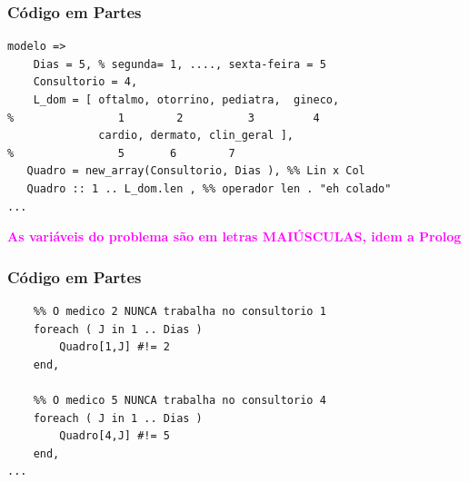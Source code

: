 \documentclass{beamer}
\begin{document}
\begin{frame}[fragile] 

\frametitle{Código em Partes}

\begin{footnotesize}
\begin{verbatim}
modelo => 
    Dias = 5, % segunda= 1, ...., sexta-feira = 5
    Consultorio = 4,
    L_dom = [ oftalmo, otorrino, pediatra,  gineco, 
%                1        2          3         4
              cardio, dermato, clin_geral ],
%                5       6        7
   Quadro = new_array(Consultorio, Dias ), %% Lin x Col
   Quadro :: 1 .. L_dom.len , %% operador len . "eh colado"
...
\end{verbatim}

\end{footnotesize}

{\bf \textcolor{magenta}{As variáveis do problema são em letras MAIÚSCULAS, idem a Prolog}}   
    
\end{frame}
\begin{frame}[fragile] 

\frametitle{Código em Partes}

\begin{footnotesize}
\begin{verbatim}
    %% O medico 2 NUNCA trabalha no consultorio 1
    foreach ( J in 1 .. Dias ) 
        Quadro[1,J] #!= 2
    end,
    
    %% O medico 5 NUNCA trabalha no consultorio 4
    foreach ( J in 1 .. Dias ) 
        Quadro[4,J] #!= 5
    end,
...
\end{verbatim}
\end{footnotesize}
    
\end{frame}
\end{document}
